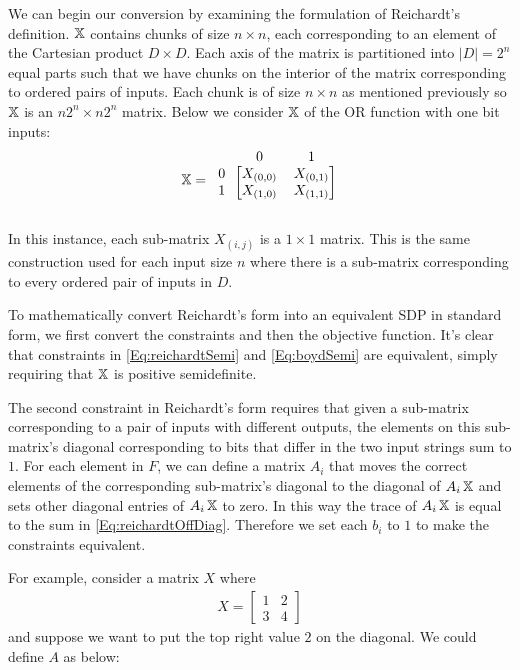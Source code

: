 We can begin our conversion by examining the formulation of Reichardt's definition. $\operatorname{\mathbb{X}}$ contains chunks of size 
$n \times n$, each corresponding to an element of the Cartesian product $D \times D$. Each axis of the matrix is partitioned into $|D| = 2^n$ equal parts such that we have chunks on the interior of the matrix corresponding to ordered pairs of inputs. Each chunk is of size $n \times n$ as mentioned previously so $\operatorname{\mathbb{X}}$ is an $n2^n \times n2^n$ matrix. Below we consider $\operatorname{\mathbb{X}}$ of the OR function with one bit inputs:
\begin{align}
\X = \begin{blockarray}{ccc}
\qquad & 0 & 1 \\
\begin{block}{c[cc]}
  0 & X_{(0,0)} & X_{(0,1)} \\
  1 & X_{(1,0)} & X_{(1,1)} \\
\end{block}
\end{blockarray}
\end{align}

In this instance, each sub-matrix $X_{(i,j)}$ is a $ 1
\times 1 $ matrix. This is the same construction used for
each input size $n$ where there is a sub-matrix
corresponding to every ordered pair of inputs in $D$.

To mathematically convert Reichardt's form into an
equivalent SDP in standard form, we first convert the
constraints and then the objective function. It's clear
that constraints in \cref{Eq:reichardtSemi} and 
\cref{Eq:boydSemi} are equivalent, simply requiring that
$\operatorname{\mathbb{X}}$ is positive semidefinite.

The second constraint in Reichardt's form requires that
given a sub-matrix corresponding to a pair of inputs with
different outputs, the elements on this sub-matrix's
diagonal corresponding to bits that differ in the two
input strings sum to $1$. For each element in $F$, we can
define a matrix $A_i$ that moves the correct elements of
the corresponding sub-matrix's diagonal to the diagonal
of $A_i \operatorname{\mathbb{X}}$ and sets other diagonal entries of $A_i \operatorname{\mathbb{X}}$
to zero. In this way the trace of $A_i \operatorname{\mathbb{X}}$ is equal to
the sum in \cref{Eq:reichardtOffDiag}. Therefore we set
each $b_i$ to $1$ to make the constraints equivalent.


For example, consider a matrix $X$ where
\begin{align}
    X = \left[ \begin{matrix} 1 & 2 \\ 3 & 4 \end{matrix} \right] \nonumber
\end{align}
and suppose we want to put the top right value $2$ on the diagonal.
We could define $A$ as below:

